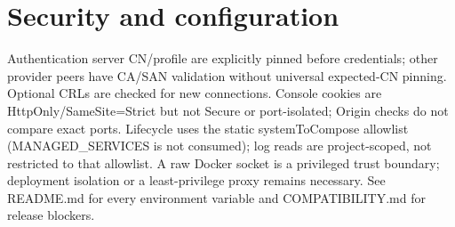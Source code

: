\documentclass[a4paper]{arrowhead}
\begin{document}
\section{Security and configuration}
Authentication server CN/profile are explicitly pinned before credentials; other provider peers have CA/SAN validation without universal expected-CN pinning. Optional CRLs are checked for new connections. Console cookies are HttpOnly/SameSite=Strict but not Secure or port-isolated; Origin checks do not compare exact ports. Lifecycle uses the static systemToCompose allowlist (MANAGED\_SERVICES is not consumed); log reads are project-scoped, not restricted to that allowlist. A raw Docker socket is a privileged trust boundary; deployment isolation or a least-privilege proxy remains necessary. See README.md for every environment variable and COMPATIBILITY.md for release blockers.
\end{document}
